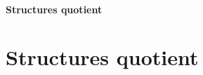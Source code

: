 \ifsolo
    ~

    \vspace{1cm}

    \begin{center}
        \textbf{\LARGE Structures quotient} \\[1em]
    \end{center}
    \tableofcontents
\else
    \chapter{Structures quotient}

    \minitoc
\fi
\thispagestyle{empty}
